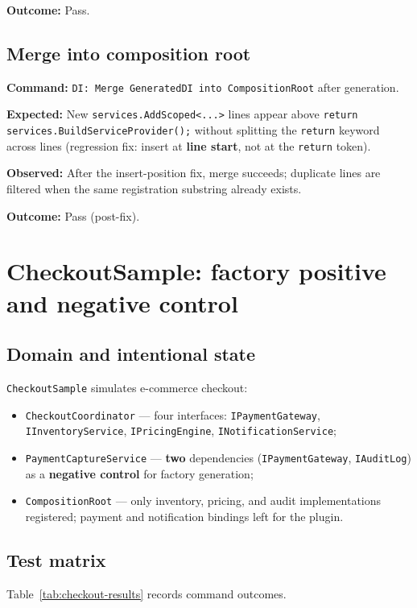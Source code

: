\textbf{Outcome:} Pass.

\subsection{Merge into composition root}

\textbf{Command:} \texttt{DI: Merge GeneratedDI into CompositionRoot} after generation.

\textbf{Expected:} New \texttt{services.AddScoped<...>} lines appear above \texttt{return services.BuildServiceProvider();} without splitting the \texttt{return} keyword across lines (regression fix: insert at \textbf{line start}, not at the \texttt{return} token).

\textbf{Observed:} After the insert-position fix, merge succeeds; duplicate lines are filtered when the same registration substring already exists.

\textbf{Outcome:} Pass (post-fix).

\section{CheckoutSample: factory positive and negative control}
\label{chap5:checkout}

\subsection{Domain and intentional state}

\texttt{CheckoutSample} simulates e-commerce checkout:
\begin{itemize}
	\item \texttt{CheckoutCoordinator} --- four interfaces: \texttt{IPaymentGateway}, \texttt{IInventoryService}, \texttt{IPricingEngine}, \texttt{INotificationService};
	\item \texttt{PaymentCaptureService} --- \textbf{two} dependencies (\texttt{IPaymentGateway}, \texttt{IAuditLog}) as a \textbf{negative control} for factory generation;
	\item \texttt{CompositionRoot} --- only inventory, pricing, and audit implementations registered; payment and notification bindings left for the plugin.
\end{itemize}

\subsection{Test matrix}

Table~\ref{tab:checkout-results} records command outcomes.

